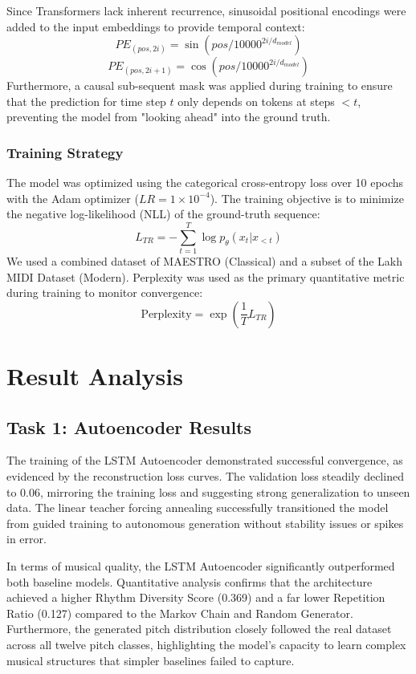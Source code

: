 \documentclass{article}
\theoremstyle{plain}
\theoremstyle{definition}
\theoremstyle{remark}
\begin{document}
Since Transformers lack inherent recurrence, sinusoidal positional encodings were added to the input embeddings to provide temporal context:
\[ PE_{(pos, 2i)} = \sin(pos / 10000^{2i/d_{model}}) \]
\[ PE_{(pos, 2i+1)} = \cos(pos / 10000^{2i/d_{model}}) \]
Furthermore, a causal sub-sequent mask was applied during training to ensure that the prediction for time step $t$ only depends on tokens at steps $<t$, preventing the model from "looking ahead" into the ground truth.

\subsubsection{Training Strategy}

The model was optimized using the categorical cross-entropy loss over 10 epochs with the Adam optimizer ($LR=1\times10^{-4}$). The training objective is to minimize the negative log-likelihood (NLL) of the ground-truth sequence:
\[ L_{TR} = - \sum_{t=1}^{T} \log p_\theta(x_t | x_{<t}) \]
We used a combined dataset of MAESTRO (Classical) and a subset of the Lakh MIDI Dataset (Modern). Perplexity was used as the primary quantitative metric during training to monitor convergence:
\[ \text{Perplexity} = \exp\left(\frac{1}{T} L_{TR}\right) \]



\section {Result Analysis}

\subsection{Task 1: Autoencoder Results}

The training of the LSTM Autoencoder demonstrated successful convergence, as evidenced by the reconstruction loss curves. The validation loss steadily declined to 0.06, mirroring the training loss and suggesting strong generalization to unseen data. The linear teacher forcing annealing successfully transitioned the model from guided training to autonomous generation without stability issues or spikes in error.

In terms of musical quality, the LSTM Autoencoder significantly outperformed both baseline models. Quantitative analysis confirms that the architecture achieved a higher Rhythm Diversity Score (0.369) and a far lower Repetition Ratio (0.127) compared to the Markov Chain and Random Generator. Furthermore, the generated pitch distribution closely followed the real dataset across all twelve pitch classes, highlighting the model's capacity to learn complex musical structures that simpler baselines failed to capture.
\end{document}
